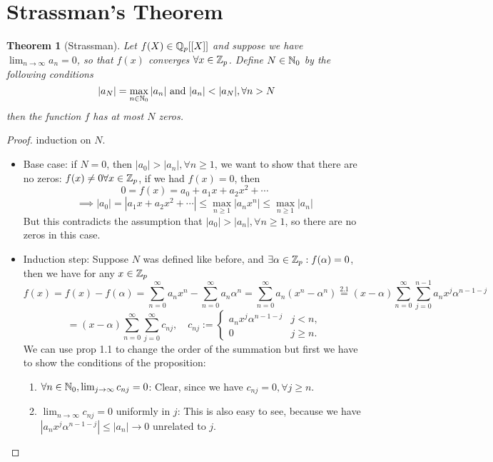 \documentclass[a4paper]{article}
\theoremstyle{plain}
\newtheorem{thm}{Theorem}[section]
\theoremstyle{definition}
\begin{document}
\section{Strassman's Theorem}
\begin{thm}[Strassman]
  Let $f(X) \in \Bbb Q_{p}[[X]]$ and suppose we have $\lim_{n \to \infty}a_{n} = 0$, so that $f(x)$ converges $\forall x \in \Bbb Z_{p}$. Define $N \in \Bbb N_{0}$ by the following conditions
  $$|a_{N}| = \max_{n \in \Bbb N_{0}}|a_{n}| \text{ and }|a_{n}| < |a_{N}|, \forall n > N$$
then the function $f$ has at most $N$ zeros.
\end{thm}
\begin{proof}
  induction on $N$.
  \begin{itemize}
    \item Base case: if $N = 0$, then $|a_{0}| > |a_{n}|, \forall n \geq 1$, we want to show that there are no zeros: $f(x) \neq 0 \forall x \in \Bbb Z_{p}$, if we had $f(x) = 0$, then
          $$0 = f(x) = a_{0} + a_{1}x + a_{2}x^{2} + \cdots$$
          $$ \implies |a_{0}| = |a_{1}x + a_{2}x^{2} + \cdots| \leq \max_{n \geq 1}|a_{n}x^{n}| \leq \max_{n \geq 1}|a_{n}|$$
          But this contradicts the assumption that $|a_{0}| > |a_{n}|, \forall n \geq 1$, so there are no zeros in this case.
    \item Induction step:
          Suppose $N$ was defined like before, and $\exists \alpha \in \Bbb Z_{p} : f(\alpha) = 0$, then we have for any $x \in \Bbb Z_{p}$
          $$f(x) = f(x) - f(\alpha) = \sum_{n=0}^{\infty}a_{n}x^{n} - \sum_{n=0}^{\infty}a_{n}\alpha^{n} = \sum_{n=0}^{\infty}a_{n}(x^{n} - \alpha^{n}) \overset{2.1}= (x-\alpha)\sum_{n=0}^{\infty}\sum_{j = 0}^{n-1} a_{n}x^{j}\alpha^{n-1-j}$$
          $$ = (x-\alpha) \sum_{n=0}^{\infty} \sum_{j=0}^{\infty} c_{nj}, \quad c_{nj}:= \begin{cases}a_{n}x^{j}\alpha^{n-1-j} & j < n, \\ 0 & j \geq n.\end{cases}$$
          We can use prop 1.1 to change the order of the summation but first we have to show the conditions of the proposition:
          \begin{enumerate}
            \item $\forall n \in \Bbb N_{0}, \lim_{j \to \infty} c_{nj} = 0$:
                  Clear, since we have $c_{nj} = 0, \forall j \geq n$.
            \item $\lim_{n \to \infty}c_{nj} = 0$ uniformly in $j$:
                  This is also easy to see, because we have $|a_{n}x^{j}\alpha^{n-1-j}| \leq |a_{n}| \to 0$ unrelated to $j$.

\end{enumerate}
\end{itemize}
\end{proof}
\end{document}
